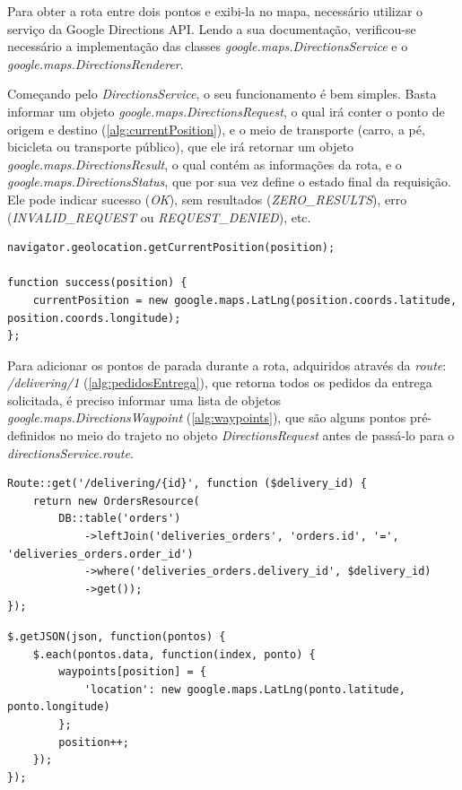 Para obter a rota entre dois pontos e exibi-la no mapa, necessário utilizar o serviço da Google Directions API. Lendo a sua documentação, verificou-se necessário a implementação das classes \textit{google.maps.DirectionsService} e o \textit{google.maps.DirectionsRenderer}.

Começando pelo \textit{DirectionsService}, o seu funcionamento é bem simples. Basta informar um objeto \textit{google.maps.DirectionsRequest}, o qual irá conter o ponto de origem e destino (\autoref{alg:currentPosition}), e o meio de transporte (carro, a pé, bicicleta ou transporte público), que ele irá retornar um objeto \textit{google.maps.DirectionsResult}, o qual contém as informações da rota, e o \textit{google.maps.DirectionsStatus}, que por sua vez define o estado final da requisição. Ele pode indicar sucesso (\textit{OK}), sem resultados (\textit{ZERO\_RESULTS}), erro (\textit{INVALID\_REQUEST} ou \textit{REQUEST\_DENIED}), etc.

\begin{lstlisting}[caption={Delivery Routes - Função de localização do usuário}, style=htmlcssjs, label=alg:currentPosition]
navigator.geolocation.getCurrentPosition(position);

function success(position) {
    currentPosition = new google.maps.LatLng(position.coords.latitude, position.coords.longitude);
};
\end{lstlisting}

Para adicionar os pontos de parada durante a rota, adquiridos através da \textit{route}: \textit{/delivering/1} (\autoref{alg:pedidosEntrega}), que retorna todos os pedidos da entrega solicitada, é preciso informar uma lista de objetos \textit{google.maps.DirectionsWaypoint} (\autoref{alg:waypoints}), que são alguns pontos pré-definidos no meio do trajeto no objeto \textit{DirectionsRequest} antes de passá-lo para o \textit{directionsService.route}.

\begin{lstlisting}[caption={Delivery Routes - Route pedidos da entrega}, style=htmlcssjs, label=alg:pedidosEntrega]
Route::get('/delivering/{id}', function ($delivery_id) {
    return new OrdersResource(
        DB::table('orders')
            ->leftJoin('deliveries_orders', 'orders.id', '=', 'deliveries_orders.order_id')
            ->where('deliveries_orders.delivery_id', $delivery_id)
            ->get());
});
\end{lstlisting}

\newpage
\begin{lstlisting}[caption={Delivery Routes - Preenchimento dos pontos de parada}, style=htmlcssjs, label=alg:waypoints]
$.getJSON(json, function(pontos) {
    $.each(pontos.data, function(index, ponto) {
        waypoints[position] = {
            'location': new google.maps.LatLng(ponto.latitude, ponto.longitude)
        };
        position++;
    });
});
\end{lstlisting}

